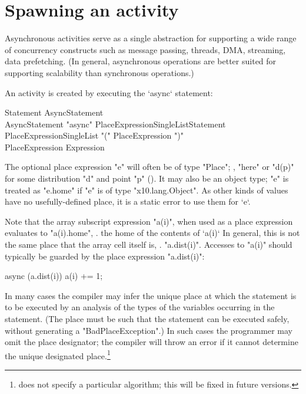 \section{Spawning an activity}\label{AsynchronousActivity}\label{AsyncActivity}

Asynchronous activities serve as a single abstraction for supporting a
wide range of concurrency constructs such as message passing, threads,
DMA, streaming, data prefetching. (In general, asynchronous operations
are better suited for supporting scalability than synchronous
operations.)

An activity is created by executing the \xcd`async` statement: 

\begin{grammar}
Statement \: AsyncStatement \\
AsyncStatement \: \xcd"async" PlaceExpressionSingleList\opt Statement \\
PlaceExpressionSingleList \: \xcd"(" PlaceExpression \xcd")" \\
PlaceExpression \: Expression 
\end{grammar} 

The optional place expression \xcd"e" will often be of  type \xcd"Place"; \eg,
\xcd"here" or \xcd"d(p)" for some 
distribution \xcd"d" and point \xcd"p" ().  
It may also be an object type; 
\xcd"e" is treated as \xcd"e.home" if
\xcd"e" is of type \xcd"x10.lang.Object". 
As other kinds of values have no usefully-defined place, it is a static error
to use them for \xcd`e`.

Note that the array subscript expression \xcd"a(i)", when used as a place
expression evaluates to \xcd"a(i).home", \viz. the home of the contents of
\xcd`a(i)` In general, this is not the same place that the array cell itself
is, \viz. \xcd"a.dist(i)". Accesses to \xcd"a(i)" should typically be guarded
by the place expression \xcd"a.dist(i)": 
\begin{xten}
async (a.dist(i)) {
  a(i) += 1;
}
\end{xten}

In many cases the compiler may infer the unique place at which the
statement is to be executed by an analysis of the types of the
variables occurring in the statement. (The place must be such that the
statement can be executed safely, without generating a
\xcd"BadPlaceException".) In such cases the programmer may omit the
place designator; the compiler will throw an error if it cannot
determine the unique designated place.\footnote{\XtenCurrVer{} does
not specify a particular algorithm; this will be fixed in future
versions.}

